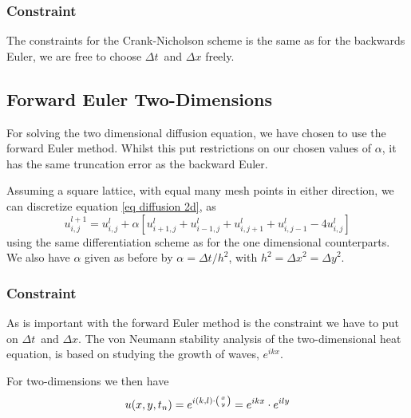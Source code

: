 \documentclass[%
reprint,
nofootinbib,
amsmath,amssymb,
aps,
]{revtex4-1}
\newcommand{\dt}{{\Delta t}}
\newcommand{\dx}{{\Delta x}}
\newcommand{\dy}{{\Delta y}}
\begin{document}
\subsubsection{Constraint}
The constraints for the Crank-Nicholson scheme is the same as for the backwards Euler, we are\cite{bookA} free to choose $\dt$ and $\dx$ freely. 

\subsection{Forward Euler Two-Dimensions}
For solving the two dimensional diffusion equation, we have chosen to use the forward Euler method. Whilst this put restrictions on our chosen values of $\alpha$, it has the same truncation error as the backward Euler. 

Assuming a square lattice, with equal many mesh points in either direction, we can discretize equation \eqref{eq diffusion 2d}, as 
\begin{equation}\label{eq FE2D}
	u_{i,j}^{l+1} = u_{i,j}^l + \alpha\left[u_{i+1,j}^{l} + u_{i-1,j}^{l} + u_{i,j+1}^{l} + u_{i,j-1}^{l} - 4u_{i,j}^{l}\right]
\end{equation}
using the same differentiation scheme as for the one dimensional counterparts. We also have $\alpha$ given as before by $\alpha = \dt/h^2$, with $h^2 = \dx^2 = \dy^2$.  

\subsubsection{Constraint}
As is important with the forward Euler method is the constraint we have to put on $\dt$ and $\dx$. The von Neumann stability analysis of the two-dimensional heat equation, is based on studying the growth of waves\cite{MITLec14}, $e^{ikx}$. 

For two-dimensions we then have 
\begin{equation}
	u(x,y,t_n) = e^{i(k,l)\cdot\left(x\atop y\right)} = e^{ikx}\cdot e^{ily}
\end{equation}
\end{document}
